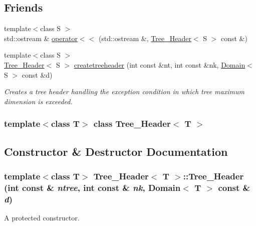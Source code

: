 \subsection*{Friends}
\begin{DoxyCompactItemize}
\item 
{\footnotesize template$<$class S $>$ }\\std::ostream \& \hyperlink{classTree__Header_a444b2368a05d862bc11bf418e11c5e51}{operator$<$$<$} (std::ostream \&, \hyperlink{classTree__Header}{Tree\_\-Header}$<$ S $>$ const \&)
\item 
{\footnotesize template$<$class S $>$ }\\\hyperlink{classTree__Header}{Tree\_\-Header}$<$ S $>$ \hyperlink{classTree__Header_a0b108322f91afa71aae8698e1da6cda8}{createtreeheader} (int const \&nt, int const \&nk, \hyperlink{classDomain}{Domain}$<$ S $>$ const \&d)
\begin{DoxyCompactList}\small\item\em Creates a tree header handling the exception condition in which tree maximum dimension is exceeded. \item\end{DoxyCompactList}\end{DoxyCompactItemize}
\subsubsection*{template$<$class T$>$ class Tree\_\-Header$<$ T $>$}



\subsection{Constructor \& Destructor Documentation}
\hypertarget{classTree__Header_a49b84b2440c27da71ae944cb94d8d856}{
\subsubsection[{Tree\_\-Header}]{\setlength{\rightskip}{0pt plus 5cm}template$<$class T$>$ {\bf Tree\_\-Header}$<$ T $>$::{\bf Tree\_\-Header} (int const \& {\em ntree}, \/  int const \& {\em nk}, \/  {\bf Domain}$<$ T $>$ const \& {\em d})}}
\label{classTree__Header_a49b84b2440c27da71ae944cb94d8d856}
A protected constructor.


